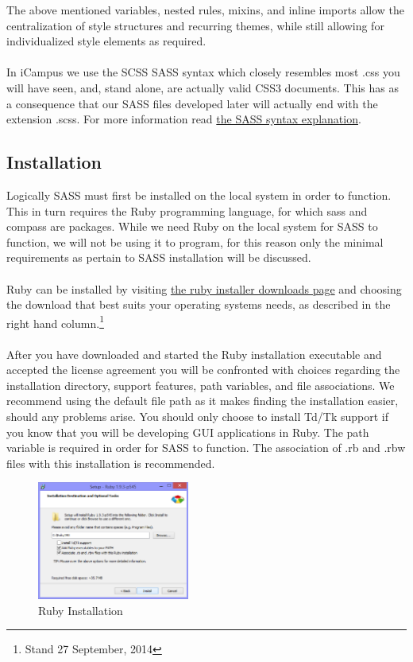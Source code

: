 \documentclass[]{report}
\begin{document}
The above mentioned variables, nested rules, mixins, and inline imports allow the centralization of style structures and recurring themes, while still allowing for individualized style elements as required.\\
\\
In iCampus we use the SCSS SASS syntax which closely resembles most .css you will have seen, and, stand alone, are actually valid CSS3 documents. This has as a consequence that our SASS files developed later will actually end with the extension .scss. For more information read \href{http://sass-lang.com/documentation/file.SASS_REFERENCE.html#syntax}{the SASS syntax explanation}.

\subsection{Installation}

Logically SASS must first be installed on the local system in order to function. This in turn requires the Ruby programming language, for which sass and compass are packages. While we need Ruby on the local system for SASS to function, we will not be using it to program, for this reason only the minimal requirements as pertain to SASS installation will be discussed.\\
\\
Ruby can be installed by visiting \href{http://www.rubyinstaller.org/downloads/}{the ruby installer downloads page} and choosing the download that best suits your operating systems needs, as described in the right hand column.\footnote{Stand 27 September, 2014}\\
\\
After you have downloaded and started the Ruby installation executable and accepted the license agreement you will be confronted with choices regarding the installation directory, support features, path variables, and file associations. We recommend using the default file path as it makes finding the installation easier, should any problems arise. You should only choose to install Td/Tk support if you know that you will be developing GUI applications in Ruby. The path variable is required in order for SASS to function. The association of .rb and .rbw files with this installation is recommended.

\newpage

\begin{figure}[h] 
	\centering
	\includegraphics[width=5cm]{rubyinstallation.png}
	\caption{Ruby Installation}
	\label{fig:rubyinstallation}
\end{figure}
\end{document}
